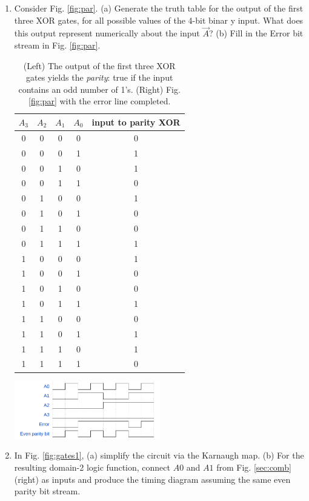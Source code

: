 \documentclass[10pt]{article}
\begin{document}
\begin{enumerate}
\item Consider Fig. \ref{fig:par}.  (a) Generate the truth table for the output of the first three XOR gates, for all possible values of the 4-bit binar	y input.  What does this output represent numerically about the input $\vec{A}$? (b) Fill in the Error bit stream in Fig. \ref{fig:par}. \\
\begin{table}[ht]
\centering
\begin{tabular}{| c | c | c | c | c |}
\hline
$A_3$ & $A_2$ & $A_1$ & $A_0$ & input to parity XOR \\ \hline \hline
0 & 0 & 0 & 0 & 0 \\ \hline
0 & 0 & 0 & 1 & 1 \\ \hline
0 & 0 & 1 & 0 & 1 \\ \hline
0 & 0 & 1 & 1 & 0 \\ \hline
0 & 1 & 0 & 0 & 1 \\ \hline
0 & 1 & 0 & 1 & 0 \\ \hline
0 & 1 & 1 & 0 & 0 \\ \hline
0 & 1 & 1 & 1 & 1 \\ \hline
1 & 0 & 0 & 0 & 1 \\ \hline
1 & 0 & 0 & 1 & 0 \\ \hline
1 & 0 & 1 & 0 & 0 \\ \hline
1 & 0 & 1 & 1 & 1 \\ \hline
1 & 1 & 0 & 0 & 0 \\ \hline
1 & 1 & 0 & 1 & 1 \\ \hline
1 & 1 & 1 & 0 & 1 \\ \hline
1 & 1 & 1 & 1 & 0 \\ \hline
\end{tabular}
\includegraphics[width=0.5\textwidth]{figures/timingExample10.pdf}
\caption{\label{tab:par} (Left) The output of the first three XOR gates yields the \textit{parity}: true if the input contains an odd number of 1's. (Right) Fig. \ref{fig:par} with the error line completed.}
\end{table}
\clearpage
\item In Fig. \ref{fig:gates1}, (a) simplify the circuit via the Karnaugh map. (b) For the resulting domain-2 logic function, connect $A0$ and $A1$ from Fig. \ref{sec:comb} (right) as inputs and produce the timing diagram assuming the same even parity bit stream. \\

\end{enumerate}
\end{document}
